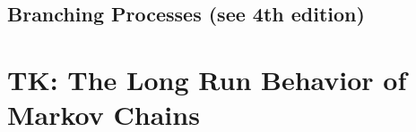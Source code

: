 \documentclass{article}
\begin{document}
\subsection{}
\subsection{}
\setcounter{subsection}{7}
\subsection{Branching Processes (see 4th edition)}

\section{TK: The Long Run Behavior of Markov Chains}
\subsection{}
\subsection{}
\subsection{}
\subsection{}
\setcounter{subsection}{5}
\subsection{}
\end{document}
